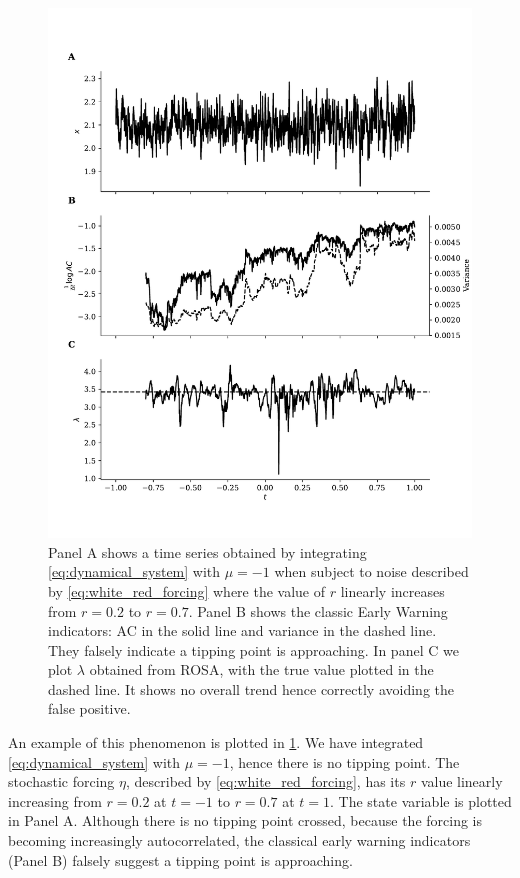 \begin{figure}
\includegraphics[width=\textwidth,keepaspectratio]{figure2}
\caption[Early Warning Signal False Positive]{Panel A shows a time series obtained by integrating  \cref{eq:dynamical_system} with $\mu = -1$ when subject to
  noise described by \cref{eq:white_red_forcing} where the
  value of $r$ linearly increases from $r=0.2$ to $r=0.7$. Panel B 
  shows the classic Early Warning indicators: AC in the solid
  line and variance in the dashed line. They falsely indicate a
  tipping point is approaching. In panel C we plot $\lambda$ obtained
  from ROSA, with the true value plotted in the dashed line. It shows
  no overall trend hence correctly avoiding the false positive.}\label{fig:changing_forcing}
\end{figure}


An example of this phenomenon is plotted in
\cref{fig:changing_forcing}. We have integrated 
\cref{eq:dynamical_system} with $\mu = -1$, hence there is no 
tipping point. The stochastic forcing $\eta$, described by \cref{eq:white_red_forcing}, has its $r$ value
linearly increasing
from $r=0.2$ at $t=-1$ to $r=0.7$ at $t=1$. The state
variable is plotted in Panel A. Although there is no
tipping point crossed, because the forcing is becoming 
increasingly autocorrelated, the classical early warning indicators 
(Panel B) falsely suggest a tipping point is approaching.

